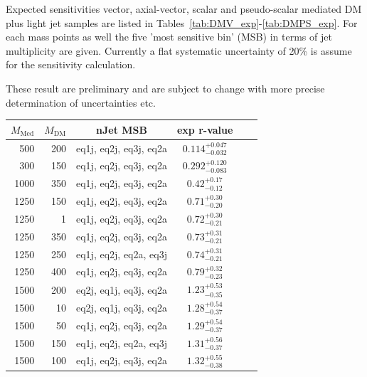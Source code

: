\clearpage


Expected sensitivities vector, axial-vector, scalar and pseudo-scalar mediated DM plus light jet samples are listed in Tables~\ref{tab:DMV_exp}-\ref{tab:DMPS_exp}. For each mass points as well the five 'most sensitive bin' (MSB) in terms of jet multiplicity are given. Currently a flat systematic uncertainty of 20\% is assume for the sensitivity calculation.

These result are preliminary and are subject to change with more precise determination of uncertainties etc.
\begin{table}
  \centering
  \begin{tabular}{rrcccc}
    \hline\hline
    $M_{\text{Med}}$ & $M_{\text{DM}}$ & nJet MSB & exp r-value \\
    \hline
  500 & 200 & eq1j, eq2j, eq3j, eq2a & $0.114_{-0.032}^{+0.047}$ \\
  300 & 150 & eq1j, eq2j, eq3j, eq2a & $0.292_{-0.083}^{+0.120}$ \\
 1000 & 350 & eq1j, eq2j, eq3j, eq2a & $0.42_{-0.12}^{+0.17}$ \\
 1250 & 150 & eq1j, eq2j, eq3j, eq2a & $0.71_{-0.20}^{+0.30}$ \\
 1250 &   1 & eq1j, eq2j, eq3j, eq2a & $0.72_{-0.21}^{+0.30}$ \\
 1250 & 350 & eq1j, eq2j, eq3j, eq2a & $0.73_{-0.21}^{+0.31}$ \\
 1250 & 250 & eq1j, eq2j, eq2a, eq3j & $0.74_{-0.21}^{+0.31}$ \\
 1250 & 400 & eq1j, eq2j, eq3j, eq2a & $0.79_{-0.23}^{+0.32}$ \\
 1500 & 200 & eq2j, eq1j, eq3j, eq2a & $1.23_{-0.35}^{+0.53}$ \\
 1500 &  10 & eq2j, eq1j, eq3j, eq2a & $1.28_{-0.37}^{+0.54}$ \\
 1500 &  50 & eq1j, eq2j, eq3j, eq2a & $1.29_{-0.37}^{+0.54}$ \\
 1500 & 150 & eq1j, eq2j, eq2a, eq3j & $1.31_{-0.37}^{+0.56}$ \\
 1500 & 100 & eq1j, eq2j, eq3j, eq2a & $1.32_{-0.38}^{+0.55}$ \\
    

\end{tabular}
\end{table}
